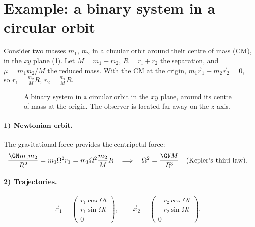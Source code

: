 \section{Example: a binary system in a circular orbit}

Consider two masses $m_1$, $m_2$ in a circular orbit around their centre of mass (CM), in the $xy$ plane (\cref{fig:binary}). Let $M=m_1+m_2$, $R=r_1+r_2$ the separation, and $\mu=m_1m_2/M$ the reduced mass. With the CM at the origin, $m_1\vec r_1+m_2\vec r_2=0$, so $r_1=\frac{m_2}{M}R$, $r_2=\frac{m_1}{M}R$.

\begin{figure}[ht]
\centering
{}
\caption{A binary system in a circular orbit in the $xy$ plane, around its centre of mass at the origin. The observer is located far away on the $z$ axis.}
\label{fig:binary}
\end{figure}

\paragraph{1) Newtonian orbit.} The gravitational force provides the centripetal force:
\[
  \frac{\GN m_1m_2}{R^2}=m_1\Omega^2r_1=m_1\Omega^2\frac{m_2}{M}R\quad\Longrightarrow\quad\Omega^2=\frac{\GN M}{R^3}\quad\text{(Kepler's third law)}.
\]
\paragraph{2) Trajectories.}
\[
  \vec x_1=\begin{pmatrix}r_1\cos\Omega t\\ r_1\sin\Omega t\\0\end{pmatrix},\qquad
  \vec x_2=\begin{pmatrix}-r_2\cos\Omega t\\ -r_2\sin\Omega t\\0\end{pmatrix}.
\]
